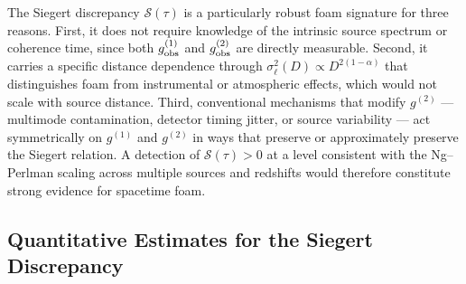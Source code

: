 \documentclass[aps,prd,onecolumn,amsmath,amssymb]{revtex4-2}
\begin{document}
The Siegert discrepancy $\mathcal{S}(\tau)$ is a particularly robust foam
signature for three reasons.
First, it does not require knowledge of the intrinsic source spectrum or
coherence time, since both $g^{(1)}_{\rm obs}$ and $g^{(2)}_{\rm obs}$ are
directly measurable.
Second, it carries a specific distance dependence through
$\sigma_\ell^2(D) \propto D^{2(1-\alpha)}$ that distinguishes foam from
instrumental or atmospheric effects, which would not scale with source distance.
Third, conventional mechanisms that modify $g^{(2)}$ — multimode contamination,
detector timing jitter, or source variability — act symmetrically on $g^{(1)}$
and $g^{(2)}$ in ways that preserve or approximately preserve the Siegert
relation.
A detection of $\mathcal{S}(\tau) > 0$ at a level consistent with the
Ng--Perlman scaling across multiple sources and redshifts would therefore
constitute strong evidence for spacetime foam.

\subsection{Quantitative Estimates for the Siegert Discrepancy}
\label{sec:siegert_numerics}
\end{document}
